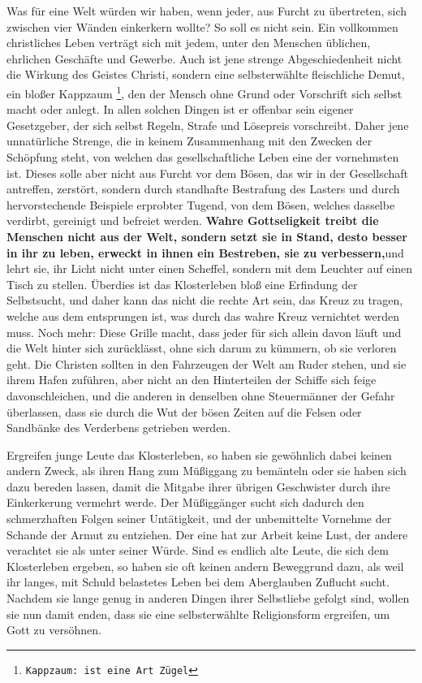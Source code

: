 \medskip

Was für eine Welt würden wir haben, wenn jeder, aus Furcht zu übertreten, sich
zwischen vier Wänden einkerkern wollte? So soll es nicht sein. Ein vollkommen
christliches Leben verträgt sich mit jedem, unter den Menschen üblichen,
ehrlichen Geschäfte und Gewerbe. Auch ist jene strenge Abgeschiedenheit nicht
die Wirkung des Geistes Christi, sondern eine selbsterwählte fleischliche
Demut, ein bloßer Kappzaum \footnote{\texttt{Kappzaum: ist eine Art Zügel}}, den der Mensch ohne Grund oder Vorschrift  sich
selbst macht oder anlegt. In allen solchen Dingen ist er offenbar sein eigener
Gesetzgeber, der sich selbst Regeln, Strafe und Lösepreis vorschreibt. Daher
jene unnatürliche Strenge, die in keinem Zusammenhang mit den Zwecken der
Schöpfung steht, von welchen das gesellschaftliche Leben eine der vornehmsten
ist. Dieses solle aber nicht aus Furcht vor dem Bösen, das wir in der
Gesellschaft antreffen, zerstört, sondern durch standhafte Bestrafung des
Lasters und durch hervorstechende Beispiele erprobter Tugend, von dem Bösen,
welches dasselbe verdirbt, gereinigt und befreiet werden. \textbf{Wahre
Gottseligkeit
treibt die Menschen nicht aus der Welt, sondern setzt sie in Stand, desto besser
in ihr zu leben, erweckt in ihnen ein Bestreben, sie zu verbessern,}und lehrt
sie, ihr Licht nicht unter einen Scheffel, sondern mit dem Leuchter auf einen
Tisch zu stellen. Überdies ist das Klosterleben bloß eine Erfindung der
Selbstsucht, und daher kann das nicht die rechte Art sein, das Kreuz zu tragen,
welche aus dem entsprungen ist, was durch das wahre Kreuz vernichtet werden muss.
Noch mehr: Diese Grille macht, dass jeder für sich allein davon läuft und die
Welt hinter sich zurücklässt, ohne sich darum zu kümmern, ob sie verloren
geht. Die Christen sollten in den Fahrzeugen der Welt am Ruder stehen, und sie
ihrem Hafen zuführen, aber nicht an den Hinterteilen der Schiffe sich feige
davonschleichen, und die anderen in denselben ohne Steuermänner der Gefahr
überlassen, dass sie durch die Wut der bösen Zeiten auf die Felsen oder
Sandbänke des Verderbens getrieben werden.
\label{ref:05_11_kloster_ende}

\medskip

Ergreifen junge Leute das Klosterleben, so haben sie gewöhnlich dabei keinen
andern Zweck, als ihren Hang zum Müßiggang zu bemänteln oder sie haben sich
dazu bereden lassen, damit die Mitgabe ihrer übrigen Geschwister durch ihre
Einkerkerung vermehrt werde. Der Müßiggänger sucht sich dadurch den
schmerzhaften Folgen seiner Untätigkeit, und der unbemittelte Vornehme der
Schande der Armut zu entziehen. Der eine hat zur Arbeit keine Lust, der andere
verachtet sie als unter seiner Würde. Sind es endlich alte Leute, die sich dem
Klosterleben ergeben, so haben sie oft keinen andern Beweggrund dazu, als weil
ihr langes, mit Schuld belastetes Leben bei dem Aberglauben Zuflucht sucht.
Nachdem sie lange genug in anderen Dingen ihrer Selbstliebe gefolgt sind, wollen
sie nun damit enden, dass sie eine selbsterwählte Religionsform ergreifen, um
Gott zu versöhnen.


